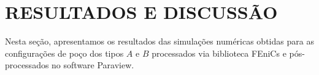 \section{RESULTADOS E DISCUSSÃO}

Nesta seção, apresentamos os resultados das simulações numéricas obtidas para as configurações de poço dos tipos $A$ e $B$ processados via biblioteca FEniCs e pós-processados no software Paraview. 




